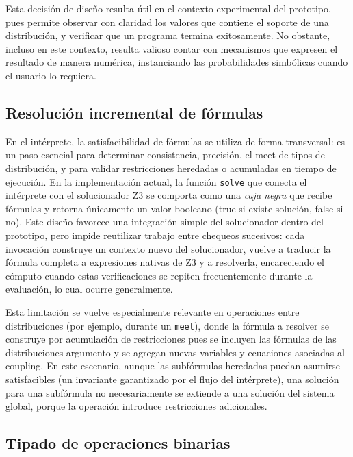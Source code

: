 Esta decisión de diseño resulta útil en el contexto experimental del
prototipo, pues permite observar con claridad los valores que
contiene el soporte de una distribución, y verificar que un programa
termina exitosamente. No obstante, incluso en este contexto, resulta
valioso contar con mecanismos que expresen el resultado de manera
numérica, instanciando las probabilidades simbólicas cuando el usuario
lo requiera.


\subsection{Resolución incremental de fórmulas}\label{subsec:lim-incremental}

En el intérprete, la satisfacibilidad de fórmulas se utiliza de forma
transversal: es un paso esencial para determinar consistencia,
precisión, el meet de tipos de distribución, y para validar
restricciones heredadas o acumuladas en tiempo de ejecución. En la
implementación actual, la función \lstinline|solve| que conecta el
intérprete con el solucionador Z3 se comporta como una \textit{caja
  negra} que recibe fórmulas y retorna únicamente un valor booleano
(true si existe solución, false si no). Este diseño favorece una
integración simple del solucionador dentro del prototipo, pero impide
reutilizar trabajo entre chequeos sucesivos: cada invocación construye
un contexto nuevo del solucionador, vuelve a traducir la fórmula completa a
expresiones nativas de Z3 y a resolverla, encareciendo el cómputo
cuando estas verificaciones se repiten frecuentemente durante la
evaluación, lo cual ocurre generalmente.

Esta limitación se vuelve especialmente relevante en operaciones entre
distribuciones (por ejemplo, durante un \lstinline|meet|), donde la
fórmula a resolver se construye por acumulación de restricciones pues
se incluyen las fórmulas de las distribuciones argumento y se agregan
nuevas variables y ecuaciones asociadas al coupling. En este
escenario, aunque las subfórmulas heredadas puedan asumirse
satisfacibles (un invariante garantizado por el flujo del intérprete),
una solución para una subfórmula no necesariamente se extiende a una
solución del sistema global, porque la operación introduce
restricciones adicionales.


\subsection{Tipado de operaciones binarias}\label{subsec:lim-binops}

